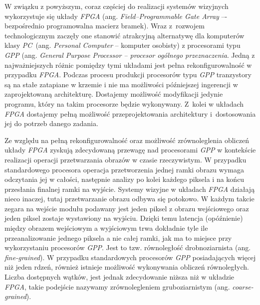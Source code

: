 W związku z powyższym, coraz częściej do realizacji systemów wizyjnych wykorzystuje się układy \textit{FPGA} (ang. \textit{Field--Programmable Gate Array} –- bezpośrednio programowalna macierz bramek). 
Wraz z~rozwojem technologicznym zaczęły one stanowić atrakcyjną alternatywę dla komputerów klasy \textit{PC}~(ang. \textit{Personal Computer} -- komputer osobisty) z procesorami typu \textit{GPP} (ang. \textit{General Purpose Processor -- procesor ogólnego przeznaczenia}. 
Jedną z najważniejszych różnic pomiędzy tymi układami jest pełna rekonfigurowalność w przypadku \textit{FPGA}. 
Podczas procesu produkcji procesorów typu \textit{GPP} tranzystory są na stałe zatapiane w krzemie i nie ma możliwości późniejszej ingerencji w zaprojektowaną architekturę.  
Dostajemy możliwość modyfikacji jedynie programu, który na takim procesorze będzie wykonywany. 
Z~kolei w układach \textit{FPGA} dostajemy pełną możliwość przeprojektowania architektury i~dostosowania jej do potrzeb danego zadania. 

Ze względu na pełną rekonfigurowalność oraz możliwość zrównoleglenia obliczeń układy \textit{FPGA} zyskują zdecydowaną przewagę nad procesorami \textit{GPP} w kontekście realizacji operacji przetwarzania obrazów w czasie rzeczywistym. 
W przypadku standardowego procesora operacja przetworzenia jednej ramki obrazu wymaga odczytania jej w całości, następnie analizy po kolei każdego piksela i na końcu przesłania finalnej ramki na wyjście. 
Systemy wizyjne w układach \textit{FPGA} działają nieco inaczej, tutaj przetwarzanie obrazu odbywa się potokowo. 
W każdym takcie zegara na wejście modułu podawany jest jeden piksel z obrazu wejściowego oraz jeden piksel zostaje wystawiony na wyjściu. 
Dzięki temu latencja (opóźnienie) między obrazem wejściowym a wyjściowym trwa dokładnie tyle ile przeanalizowanie jednego piksela a nie całej ramki, jak ma to miejsce przy wykorzystaniu procesorów \textit{GPP}. 
Jest to tzw. równoległość drobnoziarnista (ang. \textit{fine-grained}). 
W przypadku standardowych procesorów \textit{GPP} posiadających więcej niż jeden rdzeń, również istnieje możliwość wykonywania obliczeń równoległych. 
Liczba dostępnych wątków, jest jednak zdecydowanie niższa niż w układzie \textit{FPGA}, takie podejście nazywamy zrównolegleniem gruboziarnistym (ang. \textit{coarse-grained}). 

